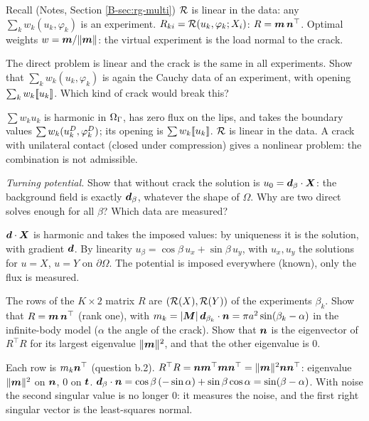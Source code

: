 \begin{gbox}{Recall (Notes, Section \ref{B-sec:rg-multi})}
$\mathcal{R}$ is linear in the data: any $\sum_kw_k(u_k,\varphi_k)$ is an experiment.
$R_{ki}=\mathcal{R}(u_k,\varphi_k;X_i)$: $R=\bm{m}\,\bm{n}^{\top}$. Optimal weights
$w=\bm{m}/\|\bm{m}\|$: the virtual experiment is the load normal to the crack.
\end{gbox}

\q The direct problem is linear and the crack is the same in all
experiments. Show that $\sum_kw_k(u_k,\varphi_k)$ is again the Cauchy data of
an experiment, with opening $\sum_kw_k[\![u_k]\!]$. Which kind of crack would
break this?
\begin{answer}
$\sum w_ku_k$ is harmonic in $\Omega_\Gamma$, has zero flux on the lips, and takes the
boundary values $\sum w_k(u^{D}_k,\varphi^{D}_k)$; its opening is $\sum w_k[\![u_k]\!]$.
$\mathcal{R}$ is linear in the data. A crack with unilateral contact (closed under
compression) gives a nonlinear problem: the combination is not admissible.
\end{answer}

\q \emph{Turning potential.} Show that without crack the solution is
$u_0=\bm{d}_\beta\cdot\bm{X}$: the background field is exactly $\bm{d}_\beta$,
whatever the shape of $\Omega$. Why are two direct solves enough for all
$\beta$? Which data are measured?
\begin{answer}
$\bm{d}\cdot\bm{X}$ is harmonic and takes the imposed values: by uniqueness it
is the solution, with gradient $\bm{d}$. By linearity
$u_\beta=\cos\beta\,u_x+\sin\beta\,u_y$, with $u_x,u_y$ the solutions for
$u=X$, $u=Y$ on $\partial\Omega$. The potential is imposed everywhere (known),
only the flux is measured.
\end{answer}

\q The rows of the $K\times2$ matrix $R$ are $(\mathcal{R}(X),\mathcal{R}(Y))$ of the
experiments $\beta_k$. Show that $R=\bm{m}\,\bm{n}^{\top}$ (rank one), with
$m_k=|\bm{M}|\,\bm{d}_{\beta_k}\cdot\bm{n}=\pi a^2\sin(\beta_k-\alpha)$ in the
infinite-body model ($\alpha$ the angle of the crack). Show that $\bm{n}$ is the
eigenvector of $R^{\top}R$ for its largest eigenvalue $\|\bm{m}\|^2$, and that
the other eigenvalue is $0$.
\begin{answer}
Each row is $m_k\bm{n}^{\top}$ (question b.2). $R^{\top}R=\bm{n}\bm{m}^{\top}\bm{m}
\bm{n}^{\top}=\|\bm{m}\|^2\bm{n}\bm{n}^{\top}$: eigenvalue $\|\bm{m}\|^2$ on $\bm{n}$, $0$ on
$\bm{t}$. $\bm{d}_\beta\cdot\bm{n}=\cos\beta\,(-\sin\alpha)+\sin\beta\cos\alpha=
\sin(\beta-\alpha)$. With noise the second singular value is no longer $0$:
it measures the noise, and the first right singular vector is the
least-squares normal.
\end{answer}


